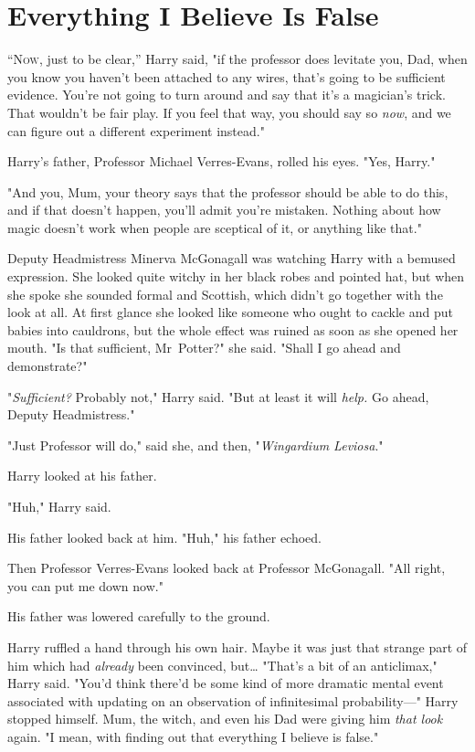 \chapter{Everything I Believe Is False}

\lettrine{“N}{ow}, just to be clear,'' Harry said, "if the professor does levitate you, Dad,
when you know you haven't been attached to any wires, that's going to be
sufficient evidence. You're not going to turn around and say that it's a
magician's trick. That wouldn't be fair play. If you feel that way, you should
say so \emph{now}, and we can figure out a different experiment instead."

Harry's father, Professor Michael Verres-Evans, rolled his eyes. "Yes, Harry."

"And you, Mum, your theory says that the professor should be able to do this,
and if that doesn't happen, you'll admit you're mistaken. Nothing about how
magic doesn't work when people are sceptical of it, or anything like that."

Deputy Headmistress Minerva McGonagall was watching Harry with a bemused
expression. She looked quite witchy in her black robes and pointed hat, but
when she spoke she sounded formal and Scottish, which didn't go together with
the look at all. At first glance she looked like someone who ought to cackle
and put babies into cauldrons, but the whole effect was ruined as soon as she
opened her mouth. "Is that sufficient, Mr~Potter?" she said. "Shall I go ahead
and demonstrate?"

"\emph{Sufficient?} Probably not," Harry said. "But at least it will
\emph{help.} Go ahead, Deputy Headmistress."

"Just Professor will do," said she, and then, "\emph{Wingardium Leviosa}."

Harry looked at his father.

"Huh," Harry said.

His father looked back at him. "Huh," his father echoed.

Then Professor Verres-Evans looked back at Professor McGonagall. "All right,
you can put me down now."

His father was lowered carefully to the ground.

Harry ruffled a hand through his own hair. Maybe it was just that strange part
of him which had \emph{already} been convinced, but{\ldots} "That's a bit of an
anticlimax," Harry said. "You'd think there'd be some kind of more dramatic
mental event associated with updating on an observation of infinitesimal
probability---" Harry stopped himself. Mum, the witch, and even his Dad were
giving him \emph{that look} again. "I mean, with finding out that everything I
believe is false."

